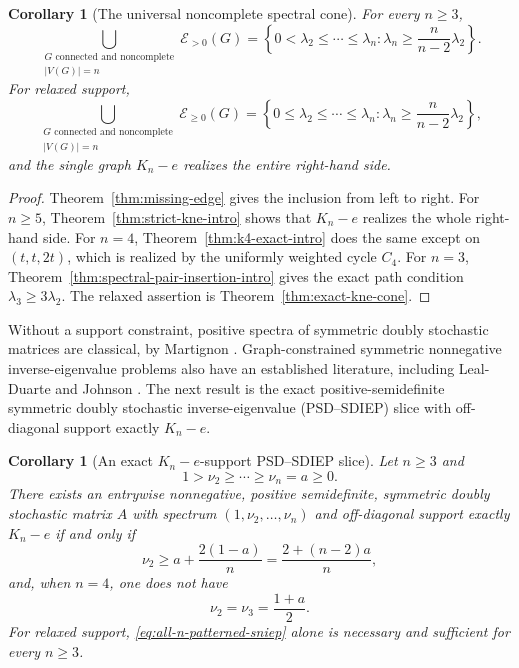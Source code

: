 \documentclass[11pt,reqno]{amsart}
\newtheorem{corollary}[theorem]{Corollary}
\theoremstyle{definition}
\theoremstyle{remark}
\begin{document}
\begin{corollary}[The universal noncomplete spectral cone]
\label{cor:universal-noncomplete-cone}
For every $n\ge3$,
\begin{equation}\label{eq:universal-noncomplete-cone}
 \bigcup_{\substack{G\text{ connected and noncomplete}\\|V(G)|=n}}
 \mathcal E_{>0}(G)
 =\left\{0<\lambda_2\le\cdots\le\lambda_n:
   \lambda_n\ge\frac n{n-2}\lambda_2\right\}.
\end{equation}
For relaxed support,
\begin{equation}\label{eq:universal-noncomplete-relaxed}
 \bigcup_{\substack{G\text{ connected and noncomplete}\\|V(G)|=n}}
 \mathcal E_{\ge0}(G)
 =\left\{0\le\lambda_2\le\cdots\le\lambda_n:
   \lambda_n\ge\frac n{n-2}\lambda_2\right\},
\end{equation}
and the single graph $K_n-e$ realizes the entire right-hand side.
\end{corollary}

\begin{proof}
Theorem~\ref{thm:missing-edge} gives the inclusion from left to right.  For
$n\ge5$, Theorem~\ref{thm:strict-kne-intro} shows that $K_n-e$ realizes the
whole right-hand side.  For $n=4$, Theorem~\ref{thm:k4-exact-intro} does the
same except on $(t,t,2t)$, which is realized by the uniformly weighted cycle
$C_4$.  For $n=3$, Theorem~\ref{thm:spectral-pair-insertion-intro} gives the
exact path condition $\lambda_3\ge3\lambda_2$.  The relaxed assertion is
Theorem~\ref{thm:exact-kne-cone}.
\end{proof}

Without a support constraint, positive spectra of symmetric doubly
stochastic matrices are classical, by Martignon \cite{Martignon1984}.
Graph-constrained symmetric nonnegative inverse-eigenvalue problems also
have an established literature, including Leal-Duarte and Johnson
\cite{LealDuarteJohnson2004}.  The next result is the exact
positive-semidefinite symmetric doubly stochastic inverse-eigenvalue
(PSD--SDIEP) slice with off-diagonal support exactly $K_n-e$.

\begin{corollary}[An exact $K_n-e$-support PSD--SDIEP slice]
\label{cor:all-n-patterned-sniep}
Let $n\ge3$ and
\[
  1>\nu_2\ge\cdots\ge\nu_n=a\ge0.
\]
There exists an entrywise nonnegative, positive semidefinite, symmetric
doubly stochastic matrix $A$ with spectrum
$(1,\nu_2,\ldots,\nu_n)$ and off-diagonal support exactly $K_n-e$ if and
only if
\begin{equation}\label{eq:all-n-patterned-sniep}
  \nu_2\ge a+\frac{2(1-a)}n
  =\frac{2+(n-2)a}{n},
\end{equation}
and, when $n=4$, one does not have
\begin{equation}\label{eq:sniep-k4-exception}
  \nu_2=\nu_3=\frac{1+a}{2}.
\end{equation}
For relaxed support, \eqref{eq:all-n-patterned-sniep} alone is necessary and
sufficient for every $n\ge3$.
\end{corollary}
\end{document}
